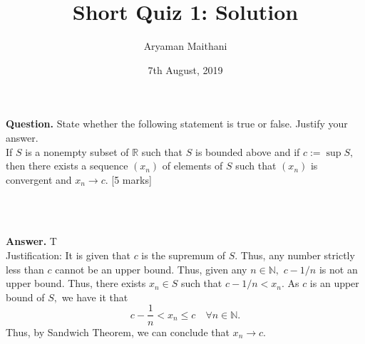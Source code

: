 \documentclass{article}
\title{Short Quiz 1: Solution}
\author{Aryaman Maithani}
\date{7th August, 2019}
\begin{document}
\maketitle

\hrulefill

\textbf{Question.} State whether the following statement is true or false. Justify your answer.\\
If $S$ is a nonempty subset of $\mathbb{R}$ such that $S$ is bounded above and if $c := \sup S,$ then there exists a sequence $(x_n)$ of elements of $S$ such that $(x_n)$ is convergent and $x_n \to c.$ \hfill [5 marks]
\begin{flushright}
	\\~\\
\end{flushright}
\textbf{Answer.} T\\
Justification: It is given that $c$ is the supremum of $S.$ Thus, any number strictly less than $c$ cannot be an upper bound. Thus, given any $n \in \mathbb{N},$ $c - 1/n$ is not an upper bound. Thus, there exists $x_n \in S$ such that $c-1/n < x_n.$ As $c$ is an upper bound of $S,$ we have it that
\[c - \frac{1}{n} < x_n \le c \quad \forall n \in \mathbb{N}.\]
Thus, by Sandwich Theorem, we can conclude that $x_n \to c.$

\hrulefill
\end{document}
